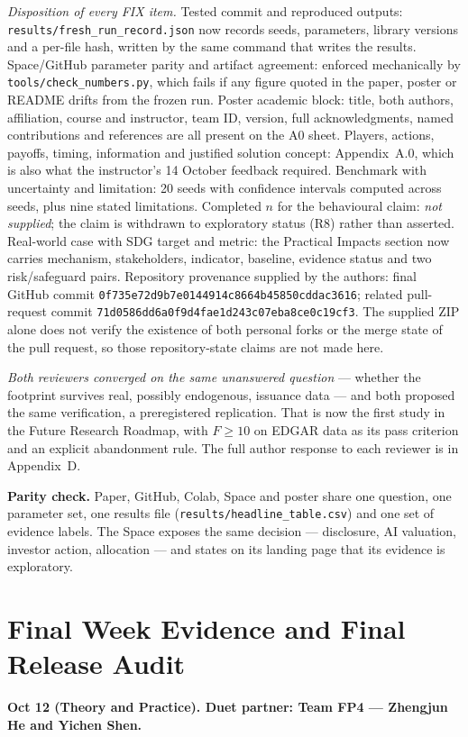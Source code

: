 \emph{Disposition of every FIX item.} Tested commit and reproduced outputs: \texttt{results/fresh\_run\_record.json} now records seeds, parameters, library versions and a per-file hash, written by the same command that writes the results. Space/GitHub parameter parity and artifact agreement: enforced mechanically by \texttt{tools/check\_numbers.py}, which fails if any figure quoted in the paper, poster or README drifts from the frozen run. Poster academic block: title, both authors, affiliation, course and instructor, team ID, version, full acknowledgments, named contributions and references are all present on the A0 sheet. Players, actions, payoffs, timing, information and justified solution concept: Appendix~A.0, which is also what the instructor's 14 October feedback required. Benchmark with uncertainty and limitation: 20 seeds with confidence intervals computed across seeds, plus nine stated limitations. Completed $n$ for the behavioural claim: \emph{not supplied}; the claim is withdrawn to exploratory status (R8) rather than asserted. Real-world case with SDG target and metric: the Practical Impacts section now carries mechanism, stakeholders, indicator, baseline, evidence status and two risk/safeguard pairs. Repository provenance supplied by the authors: final GitHub commit \texttt{0f735e72d9b7e0144914c8664b45850cddac3616}; related pull-request commit \texttt{71d0586dd6a0f9d4fae1d243c07eba8ce0c19cf3}. The supplied ZIP alone does not verify the existence of both personal forks or the merge state of the pull request, so those repository-state claims are not made here.

\emph{Both reviewers converged on the same unanswered question} --- whether the footprint survives real, possibly endogenous, issuance data --- and both proposed the same verification, a preregistered replication. That is now the first study in the Future Research Roadmap, with $F\ge10$ on EDGAR data as its pass criterion and an explicit abandonment rule. The full author response to each reviewer is in Appendix~D.

\textbf{Parity check.} Paper, GitHub, Colab, Space and poster share one question, one parameter set, one results file (\texttt{results/headline\_table.csv}) and one set of evidence labels. The Space exposes the same decision --- disclosure, AI valuation, investor action, allocation --- and states on its landing page that its evidence is exploratory.

\section{Final Week Evidence and Final Release Audit}
\textbf{Oct 12 (Theory and Practice). Duet partner: Team FP4 --- Zhengjun He and Yichen Shen.}

